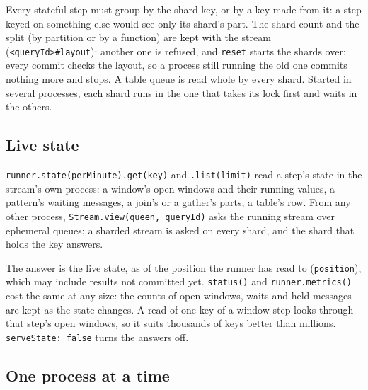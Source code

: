 
Every stateful step must group by the shard key, or by a key made from it: a step keyed on something else would see only its shard's part. The shard count and the split (by partition or by a function) are kept with the stream (\texttt{\textless{}queryId\textgreater{}\#layout}): another one is refused, and \texttt{reset} starts the shards over; every commit checks the layout, so a process still running the old one commits nothing more and stops. A table queue is read whole by every shard. Started in several processes, each shard runs in the one that takes its lock first and waits in the others.


\subsection{Live state}

\texttt{runner.state(\textquotesingle{}perMinute\textquotesingle{}).get(key)} and \texttt{.list(limit)} read a step's state in the stream's own process: a window's open windows and their running values, a pattern's waiting messages, a join's or a gather's parts, a table's row. From any other process, \texttt{Stream.view(queen,\ queryId)} asks the running stream over ephemeral queues; a sharded stream is asked on every shard, and the shard that holds the key answers.


The answer is the live state, as of the position the runner has read to (\texttt{position}), which may include results not committed yet. \texttt{status()} and \texttt{runner.metrics()} cost the same at any size: the counts of open windows, waits and held messages are kept as the state changes. A read of one key of a window step looks through that step's open windows, so it suits thousands of keys better than millions. \texttt{serveState:\ false} turns the answers off.


\subsection{One process at a time}

